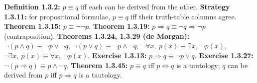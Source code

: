 \begin{key}
\textbf{Definition 1.3.2:} $p\equiv q$ iff each can be derived from the other. \textbf{Strategy 1.3.11:} for propositional formulae, $p\equiv q$ iff their truth-table columns agree. \textbf{Theorem 1.3.15:} $p\equiv\neg\neg p$. \textbf{Theorem 1.3.19:} $p\Rightarrow q\equiv\neg q\Rightarrow\neg p$ (contraposition). \textbf{Theorems 1.3.24, 1.3.29 (de Morgan):} $\neg(p\wedge q)\equiv\neg p\vee\neg q$, $\neg(p\vee q)\equiv\neg p\wedge\neg q$, $\neg\forall x,\ p(x)\equiv\exists x,\ \neg p(x)$, $\neg\exists x,\ p(x)\equiv\forall x,\ \neg p(x)$. \textbf{Exercise 1.3.13:} $p\Rightarrow q\equiv\neg p\vee q$. \textbf{Exercise 1.3.27:} $\neg(p\Rightarrow q)\equiv p\wedge\neg q$. \textbf{Theorem 1.3.45:} $p\equiv q$ iff $p\Leftrightarrow q$ is a tautology; $q$ can be derived from $p$ iff $p\Rightarrow q$ is a tautology.
\end{key}

